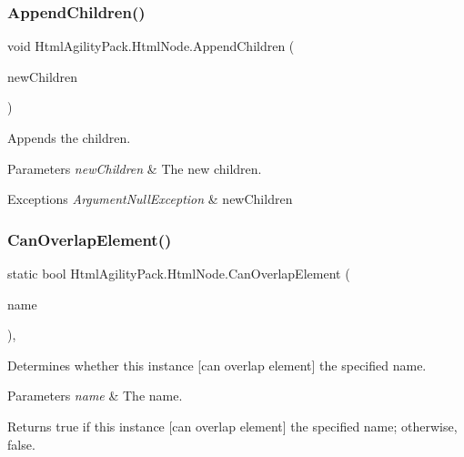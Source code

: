 \subsubsection{\texorpdfstring{Append\+Children()}{AppendChildren()}}
{\footnotesize\ttfamily void Html\+Agility\+Pack.\+Html\+Node.\+Append\+Children (\begin{DoxyParamCaption}\item[{\hyperlink{class_html_agility_pack_1_1_html_node_collection}{Html\+Node\+Collection}}]{new\+Children }\end{DoxyParamCaption})\hspace{0.3cm}{\ttfamily [inline]}}



Appends the children. 


\begin{DoxyParams}{Parameters}
{\em new\+Children} & The new children.\\
\hline
\end{DoxyParams}

\begin{DoxyExceptions}{Exceptions}
{\em Argument\+Null\+Exception} & new\+Children\\
\hline
\end{DoxyExceptions}
\mbox{\label{class_html_agility_pack_1_1_html_node_a2d50cc5b57ea2c85a032cc064bde24d2}} 
\subsubsection{\texorpdfstring{Can\+Overlap\+Element()}{CanOverlapElement()}}
{\footnotesize\ttfamily static bool Html\+Agility\+Pack.\+Html\+Node.\+Can\+Overlap\+Element (\begin{DoxyParamCaption}\item[{string}]{name }\end{DoxyParamCaption})\hspace{0.3cm}{\ttfamily [inline]}, {\ttfamily [static]}}



Determines whether this instance \mbox{[}can overlap element\mbox{]} the specified name. 


\begin{DoxyParams}{Parameters}
{\em name} & The name.\\
\hline
\end{DoxyParams}
\begin{DoxyReturn}{Returns}
{\ttfamily true} if this instance \mbox{[}can overlap element\mbox{]} the specified name; otherwise, {\ttfamily false}.
\end{DoxyReturn}

